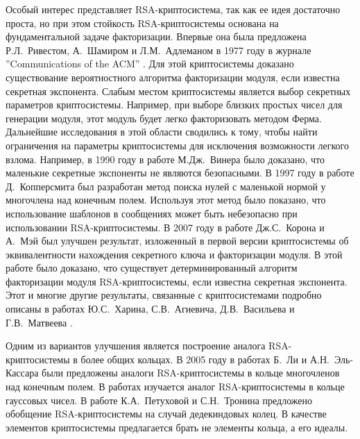 \documentclass[_00_dissertation.tex]{subfiles}
\begin{document}
Особый интерес представляет RSA-криптосистема, так как ее идея достаточно проста, но при этом стойкость RSA-криптосистемы основана на фундаментальной задаче факторизации.
Впервые она была предложена Р.Л.~Ривестом, А.~Шамиром и Л.М.~Адлеманом в 1977 году в журнале ''Communications of the ACM'' \cite{source:Rivest}.
Для этой криптосистемы доказано существование вероятностного алгоритма факторизации модуля, если известна секретная экспонента.
Слабым местом криптосистемы является выбор секретных параметров криптосистемы.
Например, при выборе близких простых чисел для генерации модуля, этот модуль будет легко факторизовать методом Ферма.
Дальнейшие исследования в этой области сводились к тому, чтобы найти ограничения на параметры криптосистемы для исключения возможности легкого взлома.
Например, в 1990 году в работе М.Дж.~Винера \cite{source:Wiener} было доказано, что маленькие секретные экспоненты не являются безопасными.
В 1997 году в работе Д.~Копперсмита \cite{source:Coppersmith} был разработан метод поиска нулей с маленькой нормой у многочлена над конечным полем.
Используя этот метод было показано, что использование шаблонов в сообщениях может быть небезопасно при использовании RSA-криптосистемы.
В 2007 году в работе Дж.С.~Корона и А.~Мэй \cite{source:Coron} был улучшен результат, изложенный в первой версии криптосистемы об эквивалентности нахождения секретного ключа и факторизации модуля.
В этой работе было доказано, что существует детерминированный алгоритм факторизации модуля RSA-криптосистемы, если известна секретная экспонента.
Этот и многие другие результаты, связанные с криптосистемами подробно описаны в работах Ю.С.~Харина, С.В.~Агиевича, Д.В.~Васильева и Г.В.~Матвеева \cite{source:Kharin, source:Matveev_2019, source:Matveev_2018}.

Одним из вариантов улучшения является построение аналога RSA-криптосистемы в более общих кольцах.
В 2005 году в работах Б.~Ли и А.Н.~Эль-Кассара \cite{source:Li, source:El_Kassar} были предложены аналоги RSA-криптосистемы в кольце многочленов над конечным полем.
В работах \cite{source:Elkamchouchi, source:Koval, source:El_Kassar} изучается аналог RSA-криптосистемы в кольце гауссовых чисел.
В работе К.А.~Петуховой и С.Н.~Тронина \cite{source:Petukhova} предложено обобщение RSA-криптосистемы на случай дедекиндовых колец.
В качестве элементов криптосистемы предлагается брать не элементы кольца, а его идеалы.
\end{document}
